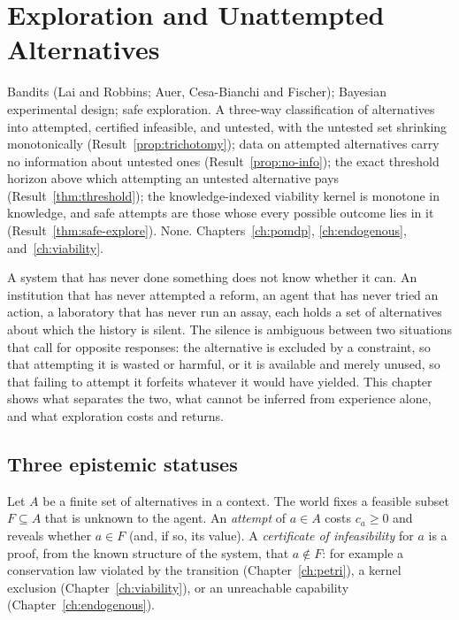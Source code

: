 \chapter{Exploration and Unattempted Alternatives}\label{ch:exploration}
{Bandits (Lai and Robbins; Auer, Cesa-Bianchi and Fischer); Bayesian experimental design; safe exploration.}
{A three-way classification of alternatives into attempted, certified infeasible, and untested, with the untested set shrinking monotonically (Result~\ref{prop:trichotomy}); data on attempted alternatives carry no information about untested ones (Result~\ref{prop:no-info}); the exact threshold horizon above which attempting an untested alternative pays (Result~\ref{thm:threshold}); the knowledge-indexed viability kernel is monotone in knowledge, and safe attempts are those whose every possible outcome lies in it (Result~\ref{thm:safe-explore}).}
{None.}
{Chapters~\ref{ch:pomdp}, \ref{ch:endogenous}, and~\ref{ch:viability}.}

A system that has never done something does not know whether it can. An institution that has never attempted a reform, an agent that has never tried an action, a laboratory that has never run an assay, each holds a set of alternatives about which the history is silent. The silence is ambiguous between two situations that call for opposite responses: the alternative is excluded by a constraint, so that attempting it is wasted or harmful, or it is available and merely unused, so that failing to attempt it forfeits whatever it would have yielded. This chapter shows what separates the two, what cannot be inferred from experience alone, and what exploration costs and returns.

\section{Three epistemic statuses}

Let $A$ be a finite set of alternatives in a context. The world fixes a feasible subset $F\subseteq A$ that is unknown to the agent. An \emph{attempt} of $a\in A$ costs $c_a\ge0$ and reveals whether $a\in F$ (and, if so, its value). A \emph{certificate of infeasibility} for $a$ is a proof, from the known structure of the system, that $a\notin F$: for example a conservation law violated by the transition (Chapter~\ref{ch:petri}), a kernel exclusion (Chapter~\ref{ch:viability}), or an unreachable capability (Chapter~\ref{ch:endogenous}).

